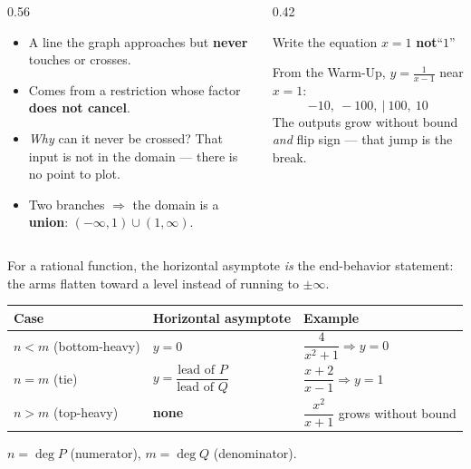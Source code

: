 \documentclass[aspectratio=169, 11pt]{beamer}
\begin{document}
\begin{frame}[t, plain]
  \begin{columns}[T]
    \begin{column}{0.56\textwidth}
      \begin{itemize}\setlength{\itemsep}{5pt}
        \item A line the graph approaches but \textbf{never} touches or crosses.
        \item Comes from a restriction whose factor \textbf{does not cancel}.
        \item \emph{Why} can it never be crossed? That input is not in the domain --- there is no
              point to plot.
        \item Two branches $\Rightarrow$ the domain is a \textbf{union}:
              $(-\infty,1)\cup(1,\infty)$.
      \end{itemize}
    \end{column}
    \begin{column}{0.42\textwidth}
      \begin{block}{Write the equation}
        \centering
        $x=1$ \quad\textbf{not}\quad ``$1$''
      \end{block}
      \vspace{4pt}
      {\footnotesize From the Warm-Up, $y=\frac{1}{x-1}$ near $x=1$:
      \[ -10,\ -100,\ \big|\ 100,\ 10 \]
      The outputs grow without bound \emph{and} flip sign --- that jump is the break.}
    \end{column}
  \end{columns}
\end{frame}

\begin{frame}[t, plain]
  For a rational function, the horizontal asymptote \emph{is} the end-behavior statement: the arms
  flatten toward a level instead of running to $\pm\infty$.
  \vspace{4pt}
  \begin{center}
  \renewcommand{\arraystretch}{1.5}
  \begin{tabular}{lll}
  \hline
  \textbf{Case} & \textbf{Horizontal asymptote} & \textbf{Example} \\
  \hline
  $n<m$ \; (bottom-heavy) & $y=0$ & $\dfrac{4}{x^2+1}\Rightarrow y=0$ \\
  $n=m$ \; (tie) & $y=\dfrac{\text{lead of }P}{\text{lead of }Q}$ & $\dfrac{x+2}{x-1}\Rightarrow y=1$ \\
  $n>m$ \; (top-heavy) & \textbf{none} & $\dfrac{x^2}{x+1}$ grows without bound \\
  \hline
  \end{tabular}
  \end{center}
  \vspace{2pt}
  \begin{center}\footnotesize $n=\deg P$ (numerator), \quad $m=\deg Q$ (denominator).\end{center}
\end{frame}
\end{document}
